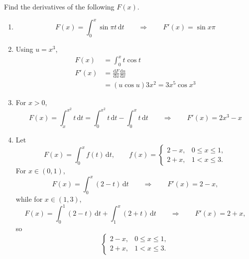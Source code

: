 \documentclass[letter-paper]{tufte-book}
\newenvironment{example}[1][Example]{\begin{trivlist}
\item[\hskip \labelsep {\bfseries #1}]}{\end{trivlist}}
\begin{document}
\begin{example}
  Find the derivatives of the following $F(x)$.
  \begin{enumerate}
    \item \begin{equation*}
      F(x)=\int_0^x \sin\pi t\, \mathrm{d}t\qquad\Rightarrow\qquad
      F'(x)=\sin x\pi
    \end{equation*}
    
    \item Using $u=x^3$,
    \begin{align*}
      F(x)  &= \int_0^x t\cos t\, \\
      F'(x) &= \frac{\mathrm{d}F}{\mathrm{d}u}\frac{\mathrm{d}u}{\mathrm{d}x} \\
        &=(u\cos u)3x^2 = 3x^5\cos x^3
    \end{align*}
    
    \item For $x>0$,
    \begin{equation*}
      F(x)=\int_x^{x^2}t\, \mathrm{d}t = 
      \int_0^{x^2}t\, \mathrm{d}t-\int_0^x t\, \mathrm{d}t
      \qquad\Rightarrow\qquad
      F'(x)=2x^3-x
    \end{equation*}
    
    \item Let
    \begin{equation*}
      F(x)=\int_0^x f(t)\, \mathrm{d}t,\qquad f(x)=
      \begin{cases} 2-x, & 0\leq x\leq 1,\\ 2+x, & 1<x\leq 3.\end{cases}
    \end{equation*}
    For $x\in(0,1)$,
    \begin{equation*}
      F(x)=\int_0^x (2-t)\, \mathrm{d}t\qquad\Rightarrow\qquad F'(x)=2-x,
    \end{equation*}
    while for $x\in(1,3)$,
    \begin{equation*}
      F(x)=\int_0^1 (2-t)\, \mathrm{d}t + \int_1^x (2+t)\, \mathrm{d}t
      \qquad\Rightarrow\qquad F'(x)=2+x,
    \end{equation*}
    so
    \begin{equation*}
      \begin{cases} 2-x, & 0\leq x\leq 1,\\ 2+x, & 1<x\leq 3.\end{cases}
    \end{equation*}
  \end{enumerate}
\end{example}
\end{document}
